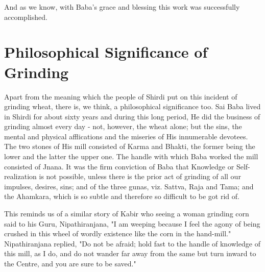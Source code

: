 And as we know, with Baba's grace and blessing this work was successfully accomplished.

\begin{center}
\end{center}

\section*{Philosophical Significance of Grinding}

Apart from the meaning which the people of Shirdi put on this incident of grinding wheat, there is, we think, a philosophical significance too. Sai Baba lived in Shirdi for about sixty years and during this long period, He did the business of grinding almost every day - not, however, the wheat alone; but the sins, the mental and physical afflications and the miseries of His innumerable devotees. The two stones of His mill consisted of Karma and Bhakti, the former being the lower and the latter the upper one. The handle with which Baba worked the mill consisted of Jnana. It was the firm conviction of Baba that Knowledge or Self-realization is not possible, unless there is the prior act of grinding of all our impulses, desires, sins; and of the three gunas, viz. Sattva, Raja and Tama; and the Ahamkara, which is so subtle and therefore so difficult to be got rid of.

This reminds us of a similar story of Kabir who seeing a woman grinding corn said to his Guru, Nipathiranjana, "I am weeping because I feel the agony of being crushed in this wheel of wordly existence like the corn in the hand-mill." Nipathiranjana replied, "Do not be afraid; hold fast to the handle of knowledge of this mill, as I do, and do not wander far away from the same but turn inward to the Centre, and you are sure to be saved."

\begin{center}
\end{center}
